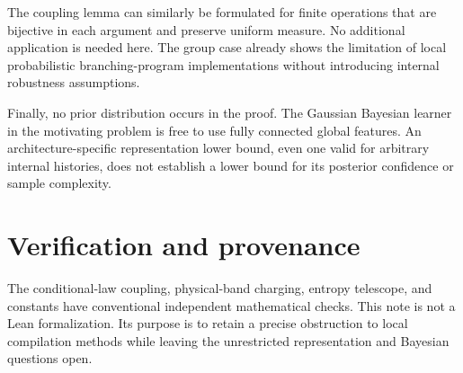 \documentclass[11pt]{article}
\theoremstyle{remark}\newtheorem{remark}[theorem]{Remark}
\begin{document}
The coupling lemma can similarly be formulated for finite operations that
are bijective in each argument and preserve uniform measure. No additional
application is needed here. The group case already shows the limitation of
local probabilistic branching-program implementations without introducing
internal robustness assumptions.

Finally, no prior distribution occurs in the proof. The Gaussian Bayesian
learner in the motivating problem is free to use fully connected global
features. An architecture-specific representation lower bound, even one
valid for arbitrary internal histories, does not establish a lower bound
for its posterior confidence or sample complexity.

\section*{Verification and provenance}

The conditional-law coupling, physical-band charging, entropy telescope,
and constants have conventional independent mathematical checks. This note
is not a Lean formalization. Its purpose is to retain a precise obstruction
to local compilation methods while leaving the unrestricted representation
and Bayesian questions open.
\end{document}
